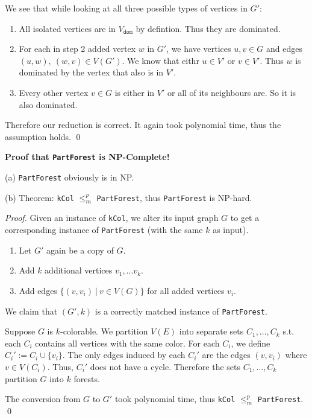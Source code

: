 \documentclass[12pt]{article}
\newcommand{\polyreduce}{$\leq_{m}^{p}$}
\begin{document}
We see that while looking at all three possible types of vertices in $G'$: \begin{enumerate}
 \item All isolated vertices are in $V_{\texttt{dom}}$ by defintion. Thus they are dominated.
 \item For each in step 2 added vertex $w$ in $G'$, we have vertices $u,v\in G$ and edges $(u,w), \ (w,v)\in V(G')$. We know that eithr $u\in V'$ or $v\in V'$. Thus $w$ is dominated by the vertex that also is in $V'$.
 \item Every other vertex $v\in G$ is either in $V'$ or all of its neighbours are. So it is also dominated.
\end{enumerate}

Therefore our reduction is correct. It again took polynomial time, thus the assumption holds. \qed




  \textbf{Proof that \texttt{PartForest} is NP-Complete!}

(a) \texttt{PartForest} obviously is in NP.

(b) Theorem: \texttt{kCol} \polyreduce{} \texttt{PartForest}, thus \texttt{PartForest} is NP-hard.

\vspace{.3cm}
\noindent \textit{Proof.} Given an instance of \texttt{kCol}, we alter its input graph $G$ to get a corresponding instance of \texttt{PartForest} (with the same $k$ as input).
\begin{enumerate}
 \item Let $G'$ again be a copy of $G$.
 \item Add $k$ additional vertices $v_1,\ldots v_k$.
 \item Add edges $\big\{(v,v_i)\ |\ v\in V(G)\big\}$ for all added vertices $v_i$.
\end{enumerate}
We claim that $(G', k)$ is a correctly matched instance of \texttt{PartForest}.

Suppose $G$ is $k$-colorable. We partition $V(E)$ into separate sets $C_1,\ldots, C_k$ s.t. each $C_i$ contains all vertices with the same color. For each $C_i$, we define $C_i':=C_i\cup\{v_i\}$. The only edges induced by each $C_i'$ are the edges $(v,v_i)$ where $v\in V(C_i)$. Thus, $C_i'$ does not have a cycle. Therefore the sets $C_1,\ldots,C_k$ partition $G$ into $k$ forests.

The conversion from $G$ to $G'$ took polynomial time, thus \texttt{kCol} \polyreduce{} \texttt{PartForest}. \qed

 
\end{document}
